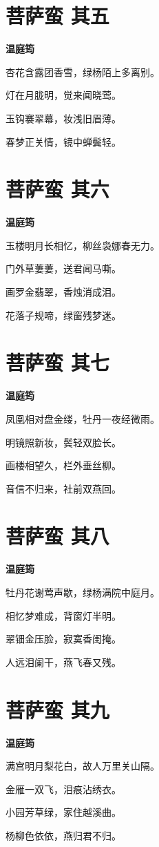 \documentclass[12pt,a4paper]{ctexbook}
\begin{document}
\section{菩萨蛮 其五}
\textbf{温庭筠}\par\vspace{0.5em}
杏花含露团香雪，绿杨陌上多离别。\par
灯在月胧明，觉来闻晓莺。\par
玉钩褰翠幕，妆浅旧眉薄。\par
春梦正关情，镜中蝉鬓轻。\par

\section{菩萨蛮 其六}
\textbf{温庭筠}\par\vspace{0.5em}
玉楼明月长相忆，柳丝袅娜春无力。\par
门外草萋萋，送君闻马嘶。\par
画罗金翡翠，香烛消成泪。\par
花落子规啼，绿窗残梦迷。\par

\section{菩萨蛮 其七}
\textbf{温庭筠}\par\vspace{0.5em}
凤凰相对盘金缕，牡丹一夜经微雨。\par
明镜照新妆，鬓轻双脸长。\par
画楼相望久，栏外垂丝柳。\par
音信不归来，社前双燕回。\par

\section{菩萨蛮 其八}
\textbf{温庭筠}\par\vspace{0.5em}
牡丹花谢莺声歇，绿杨满院中庭月。\par
相忆梦难成，背窗灯半明。\par
翠钿金压脸，寂寞香闺掩。\par
人远泪阑干，燕飞春又残。\par

\section{菩萨蛮 其九}
\textbf{温庭筠}\par\vspace{0.5em}
满宫明月梨花白，故人万里关山隔。\par
金雁一双飞，泪痕沾绣衣。\par
小园芳草绿，家住越溪曲。\par
杨柳色依依，燕归君不归。\par
\end{document}
